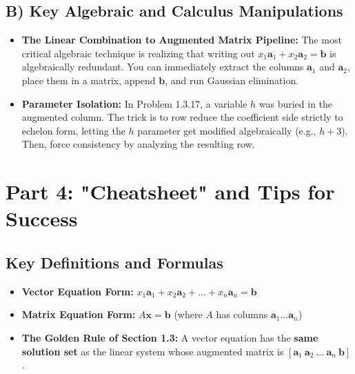 \documentclass[11pt]{article}
\begin{document}
\subsection{B) Key Algebraic and Calculus Manipulations}
\begin{itemize}
    \item \textbf{The Linear Combination to Augmented Matrix Pipeline:} The most critical algebraic technique is realizing that writing out $x_1\mathbf{a}_1 + x_2\mathbf{a}_2 = \mathbf{b}$ is algebraically redundant. You can immediately extract the columns $\mathbf{a}_1$ and $\mathbf{a}_2$, place them in a matrix, append $\mathbf{b}$, and run Gaussian elimination. 
    \item \textbf{Parameter Isolation:} In Problem 1.3.17, a variable $h$ was buried in the augmented column. The trick is to row reduce the coefficient side strictly to echelon form, letting the $h$ parameter get modified algebraically (e.g., $h+3$). Then, force consistency by analyzing the resulting row.
\end{itemize}

\newpage
\section{Part 4: "Cheatsheet" and Tips for Success}

\subsection{Key Definitions and Formulas}
\begin{itemize}
    \item \textbf{Vector Equation Form:} $x_1\mathbf{a}_1 + x_2\mathbf{a}_2 + \dots + x_n\mathbf{a}_n = \mathbf{b}$
    \item \textbf{Matrix Equation Form:} $A\mathbf{x} = \mathbf{b}$ (where $A$ has columns $\mathbf{a}_1 \dots \mathbf{a}_n$)
    \item \textbf{The Golden Rule of Section 1.3:} A vector equation has the \textbf{same solution set} as the linear system whose augmented matrix is $[\mathbf{a}_1 \ \mathbf{a}_2 \ \dots \ \mathbf{a}_n \ \mathbf{b}]$.
\end{itemize}
\end{document}
